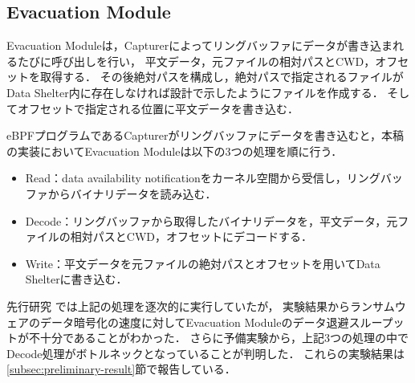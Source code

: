 \subsection{Evacuation Module}
Evacuation Moduleは，Capturerによってリングバッファにデータが書き込まれるたびに呼び出しを行い，
平文データ，元ファイルの相対パスとCWD，オフセットを取得する．
その後絶対パスを構成し，絶対パスで指定されるファイルがData Shelter内に存在しなければ設計で示したようにファイルを作成する．
そしてオフセットで指定される位置に平文データを書き込む．

eBPFプログラムであるCapturerがリングバッファにデータを書き込むと，本稿の実装においてEvacuation Moduleは以下の3つの処理を順に行う．
\begin{itemize}
  \item Read：data availability notificationをカーネル空間から受信し，リングバッファからバイナリデータを読み込む．
  \item Decode：リングバッファから取得したバイナリデータを，平文データ，元ファイルの相対パスとCWD，オフセットにデコードする．
  \item Write：平文データを元ファイルの絶対パスとオフセットを用いてData Shelterに書き込む．
\end{itemize}
先行研究 \cite{css2024} では上記の処理を逐次的に実行していたが，
実験結果からランサムウェアのデータ暗号化の速度に対してEvacuation Moduleのデータ退避スループットが不十分であることがわかった．
さらに予備実験から，上記3つの処理の中でDecode処理がボトルネックとなっていることが判明した．
これらの実験結果は\ref{subsec:preliminary-result}節で報告している．

